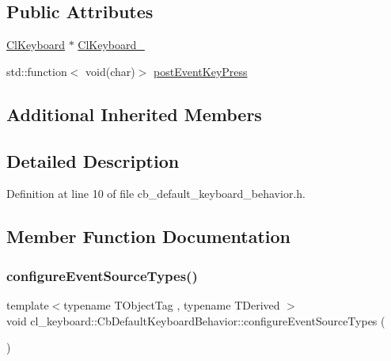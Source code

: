 \subsection*{Public Attributes}
\begin{DoxyCompactItemize}
\item 
\hyperlink{classcl__keyboard_1_1ClKeyboard}{Cl\+Keyboard} $\ast$ \hyperlink{classcl__keyboard_1_1CbDefaultKeyboardBehavior_a482e94248b8e6fbac0973d3dec0cc20b}{Cl\+Keyboard\+\_\+}
\item 
std\+::function$<$ void(char)$>$ \hyperlink{classcl__keyboard_1_1CbDefaultKeyboardBehavior_abd29833a0f94aa1d5aa1834d15ab1281}{post\+Event\+Key\+Press}
\end{DoxyCompactItemize}
\subsection*{Additional Inherited Members}


\subsection{Detailed Description}


Definition at line 10 of file cb\+\_\+default\+\_\+keyboard\+\_\+behavior.\+h.



\subsection{Member Function Documentation}
\mbox{\label{classcl__keyboard_1_1CbDefaultKeyboardBehavior_a6801e961040358ab8fb547ca7e113082}} 
\subsubsection{\texorpdfstring{configure\+Event\+Source\+Types()}{configureEventSourceTypes()}}
{\footnotesize\ttfamily template$<$typename T\+Object\+Tag , typename T\+Derived $>$ \\
void cl\+\_\+keyboard\+::\+Cb\+Default\+Keyboard\+Behavior\+::configure\+Event\+Source\+Types (\begin{DoxyParamCaption}{ }\end{DoxyParamCaption})\hspace{0.3cm}{\ttfamily [inline]}}



